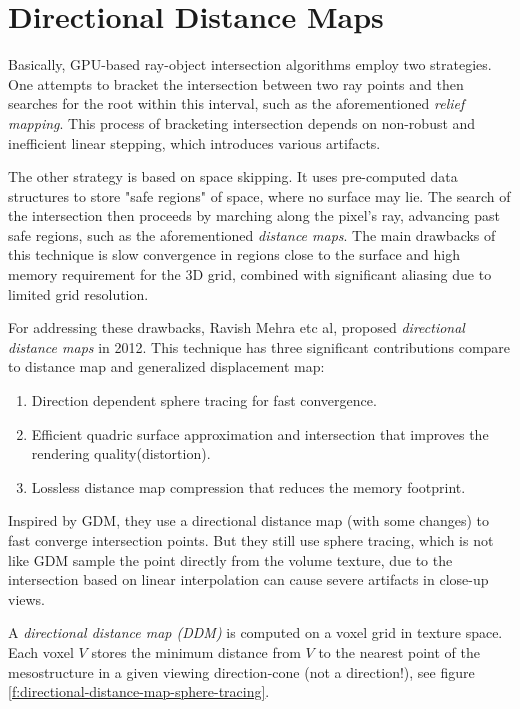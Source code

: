 \section{Directional Distance Maps}
Basically, GPU-based ray-object intersection algorithms employ two strategies. One attempts to bracket the intersection between two ray points and then searches for the root within this interval, such as the aforementioned \textit{relief mapping}. This process of bracketing intersection depends on non-robust and inefficient linear stepping, which introduces various artifacts.

The other strategy is based on space skipping. It uses pre-computed data structures to store "safe regions" of space, where no surface may lie. The search of the intersection then proceeds by marching along the pixel's ray, advancing past safe regions, such as the aforementioned \textit{distance maps}. The main drawbacks of this technique is slow convergence in regions close to the surface and high memory requirement for the 3D grid, combined with significant aliasing due to limited grid resolution.

For addressing these drawbacks, Ravish Mehra etc al, proposed \textit{directional distance maps} in 2012\cite{a:directional-distance-maps}. This technique has three significant contributions compare to distance map and generalized displacement map:

\begin{enumerate}
	\item Direction dependent sphere tracing for fast convergence.
	\item Efficient quadric surface approximation and intersection that improves the rendering quality(distortion).
	\item Lossless distance map compression that reduces the memory footprint.
\end{enumerate}

Inspired by GDM, they use a directional distance map (with some changes) to fast converge intersection points. But they still use sphere tracing, which is not like GDM sample the point directly from the volume texture, due to the intersection based on linear interpolation can cause severe artifacts in close-up views.

A \textit{directional distance map (DDM)} is computed on a voxel grid in texture space. Each voxel $V$ stores the minimum distance from $V$ to the nearest point of the mesostructure in a given viewing direction-cone (not a direction!), see figure \ref{f:directional-distance-map-sphere-tracing}.

